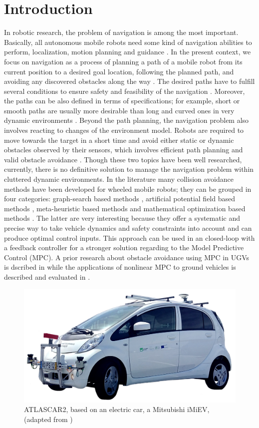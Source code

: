 \documentclass[conference,11pt]{IEEEtran}
\begin{document}
\section{Introduction}
In robotic research, the problem of navigation is among the most important. Basically, all autonomous mobile robots need some kind of navigation abilities to perform, localization, motion planning and guidance \cite{skoda}.
In the present context, we focus on navigation as a process of planning a path of a mobile robot from its current position to a desired goal location, following the planned path, and avoiding any discovered obstacles along the way \cite{fuzzyMPC} \cite{NONMPC}. The desired paths have to fulfill several conditions to ensure safety and feasibility of the navigation \cite{safety}. Moreover, the paths can be also defined in terms of specifications; for example, short or smooth paths are usually more desirable than long and curved ones in very dynamic environments \cite{archi}. Beyond the path planning, the navigation problem also involves reacting to changes of the environment model. Robots are required to move towards the target in a short time and avoid either static or dynamic obstacles observed by their sensors, which involves efficient path planning and valid obstacle avoidance \cite{MMPC} \cite{autoMPC}. Though these two topics have been well researched, currently, there is no definitive solution to manage the navigation problem within cluttered dynamic environments. In the literature many collision avoidance methods have been developed for wheeled mobile robots; they can be grouped in four categories: graph-search based methods \cite{RRT}, artificial potential field based methods \cite{potential}, meta-heuristic based methods \cite{meta-heuristic} and mathematical optimization based methods \cite{borelli2}.
The latter are very interesting because they offer a systematic and precise way to take vehicle dynamics and safety constraints into account and can produce optimal control inputs. This approach can be used in an closed-loop with a feedback controller for a stronger solution regarding to the Model Predictive Control (MPC). A prior research about obstacle avoidance using MPC in UGVs is dscribed in \cite{borelli} while the applications of nonlinear MPC to ground vehicles is described and evaluated in \cite{nonlinearmpc}.
\begin{figure}[b]
	\centering
	\includegraphics[width=0.6\columnwidth]{./figure/atlascar2.jpg}
	\caption{ATLASCAR2, based on an electric car, a Mitsubishi iMiEV, (adapted from \protect\cite{ricardo}) }
	\label{fig:atlascar2}
\end{figure}
\end{document}
